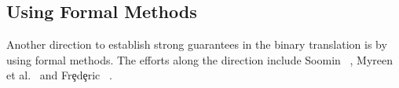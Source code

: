 %    
%    

\subsection{Using Formal Methods}
Another direction to establish strong guarantees in the binary translation is by using
formal methods. The efforts along the direction include Soomin
\etal~\cite{ASE2017}, Myreen et al.~\cite{Myreen:FMCAD:2008,Myreen:FMCAD:2012}
and Fr\c{e}d\c{e}ric \etal~\cite{inlineassm}.

